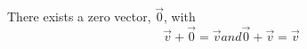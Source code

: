 \documentclass[preview]{standalone}
\begin{document}
\begin{center}
There exists a zero vector, \(\overrightarrow{0}\), with \[\overrightarrow{v} + \overrightarrow{0} = \overrightarrow{v} and \overrightarrow{0} + \overrightarrow{v} = \overrightarrow{v}\]
\end{center}
\end{document}
